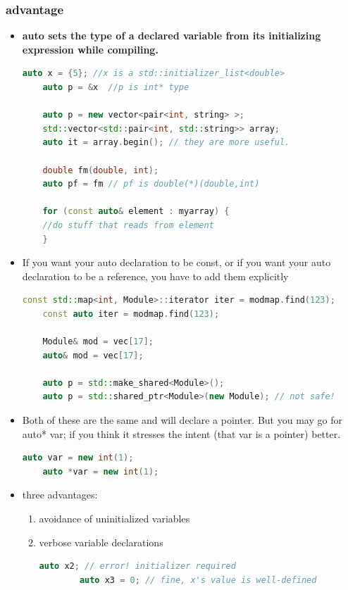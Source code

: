 \documentclass[a4paper,12pt,twoside]{book}
\begin{document}
\subsubsection{advantage}
\begin{itemize}
	
	\item \textbf{auto sets the type of a declared variable from its initializing expression while compiling.}
	
	\begin{lstlisting}[frame=single, language=c++]
	auto x = {5}; //x is a std::initializer_list<double>
	auto p = &x  //p is int* type
	
	auto p = new vector<pair<int, string> >;
	std::vector<std::pair<int, std::string>> array;
	auto it = array.begin(); // they are more useful.
	
	double fm(double, int);
	auto pf = fm // pf is double(*)(double,int)
	
	for (const auto& element : myarray) {
	//do stuff that reads from element
	}
	\end{lstlisting}
	
	\item If you want your auto declaration to be const, or if you want your auto declaration to be a reference, you have to add them explicitly
	
	\begin{lstlisting}[frame=single, language=c++]
	const std::map<int, Module>::iterator iter = modmap.find(123);
	const auto iter = modmap.find(123);
	
	Module& mod = vec[17];
	auto& mod = vec[17];
	
	auto p = std::make_shared<Module>();
	auto p = std::shared_ptr<Module>(new Module); // not safe!
	\end{lstlisting}
	
	\item Both of these are the same and will declare a pointer. But you may go for auto* var; if you think it stresses the intent (that var is a pointer) better.
	\begin{lstlisting}[frame=single, language=c++]
	auto var = new int(1);
	auto *var = new int(1);
	\end{lstlisting}
	

	\item three advantages:
	\begin{enumerate}
		\item avoidance of uninitialized variables
		\item verbose variable declarations
		\begin{lstlisting}[frame=single, language=c++]
		auto x2; // error! initializer required
		auto x3 = 0; // fine, x's value is well-defined
		

\end{lstlisting}
\end{enumerate}
\end{itemize}
\end{document}
